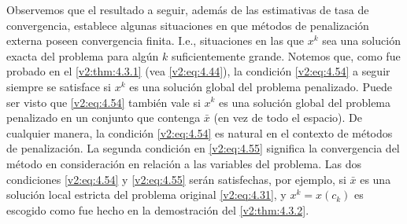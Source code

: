 Observemos que el resultado a seguir, además de las estimativas de tasa de convergencia, establece algunas situaciones en que métodos de penalización externa poseen convergencia finita. I.e., situaciones en las que $x^k$ sea una solución exacta del problema para algún $k$ suficientemente grande. Notemos que, como fue probado en el \cref{v2:thm:4.3.1} (vea \eqref{v2:eq:4.44}), la condición \eqref{v2:eq:4.54} a seguir siempre se satisface si $x^k$ es una solución global del problema penalizado. Puede ser visto que \eqref{v2:eq:4.54} también vale si $x^k$ es una solución global del problema penalizado en un conjunto que contenga $\bar{x}$ (en vez de todo el espacio). De cualquier manera, la condición \eqref{v2:eq:4.54} es natural en el contexto de métodos de penalización. La segunda condición en \eqref{v2:eq:4.55} significa la convergencia del método en consideración en relación a las variables del problema. Las dos condiciones \eqref{v2:eq:4.54} y \eqref{v2:eq:4.55} serán satisfechas, por ejemplo, si $\bar{x}$ es una solución local estricta del problema original \eqref{v2:eq:4.31}, y $x^k = x(c_k)$ es escogido como fue hecho en la demostración del \cref{v2:thm:4.3.2}.

